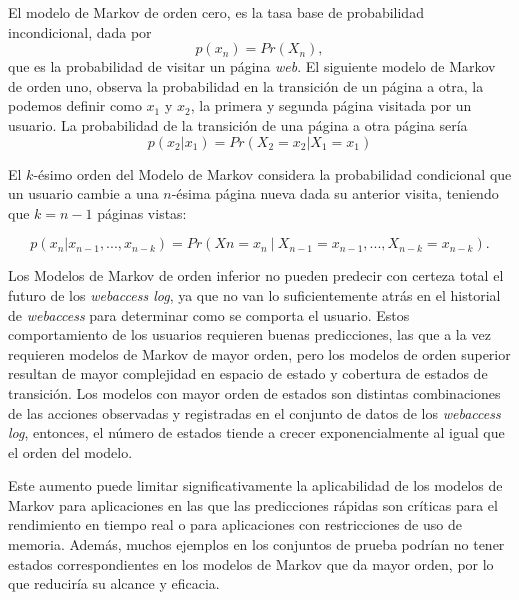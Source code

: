  El modelo de Markov de orden cero, es la tasa base de probabilidad incondicional, dada por \begin{equation}
p(x_n) = Pr(X_n) , \end{equation} que es la probabilidad de visitar un página \emph{web}. El siguiente modelo de Markov de orden uno, observa la probabilidad en la transición de un página a otra, la podemos definir como  $x_{1}$ y $x_{2}$, la primera y segunda página visitada por un usuario. La probabilidad de la transición de una página a otra página sería \begin{equation} 
	 p(x_{2} | x_1) = Pr(X_2 = x_{2} | X_1 = x_{1}) 
 \end{equation}	
 
 El $k$-ésimo orden del Modelo de Markov considera la probabilidad condicional que un usuario cambie a una $n$-ésima página nueva dada su anterior visita, teniendo que $k = n -1$ páginas vistas:

 \begin{equation}\label{eq:tantito}
 \scriptstyle
 p( x_{n} | x_{n-1},..., x_{n-k} ) = Pr(X{n} = x_{n}\ |\ X_{n-1} = x_{n-1},..., X_{n-k} = x_{n-k}) .
 \end{equation}
 
 Los Modelos de Markov de orden inferior no pueden predecir con certeza total el futuro de los \emph{webaccess log}, ya que no van lo suficientemente atrás en el historial de \emph{webaccess} para determinar como se comporta el usuario. Estos comportamiento de los usuarios requieren buenas predicciones, las que a la vez requieren modelos de Markov de mayor orden, pero los modelos de orden superior resultan de mayor complejidad en espacio de estado y cobertura de estados de transición. 
Los modelos con mayor orden de estados son distintas combinaciones de las acciones observadas y registradas en el conjunto de datos de los \emph{webaccess log}, entonces, el número de estados tiende a crecer exponencialmente al igual que el orden del modelo.
 
Este aumento puede limitar significativamente la aplicabilidad de los modelos de Markov para aplicaciones en las que las predicciones rápidas son críticas para el rendimiento en tiempo real o para aplicaciones con restricciones de uso de memoria. Además, muchos ejemplos en los conjuntos de prueba podrían no tener estados correspondientes en los modelos de Markov que da mayor orden, por lo que reduciría su alcance y eficacia.


